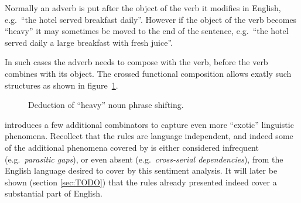 \begin{example}
Normally an adverb is put after the object of the verb it modifies in English, e.g.\ ``the hotel served breakfast daily''. However if the object of the verb becomes ``heavy'' it may sometimes be moved to the end of the sentence, e.g.\ ``the hotel served daily a large breakfast with fresh juice''.

In such cases the adverb needs to compose with the verb, before the verb combines with its object. The crossed functional composition allows exatly such structures as shown in figure~\ref{fig:heavyNP}.

\begin{figure}[ht]
\center
{}
\caption{Deduction of ``heavy'' noun phrase shifting.}
\label{fig:heavyNP}
\end{figure}
\label{ex:heavyNP}
\end{example}

\citeauthor{ts}  introduces a few additional combinators to capture even more ``exotic'' linguistic phenomena. Recollect that the rules are language independent, and indeed some of the additional phenomena covered by \citeauthor{sp} is either considered infrequent (e.g.\ \emph{parasitic gaps}), or even absent (e.g.\ \emph{cross-serial dependencies}), from the English language desired to cover by this sentiment analysis. It will later be shown (section \ref{sec:TODO}) that the rules already presented indeed cover a substantial part of English.

